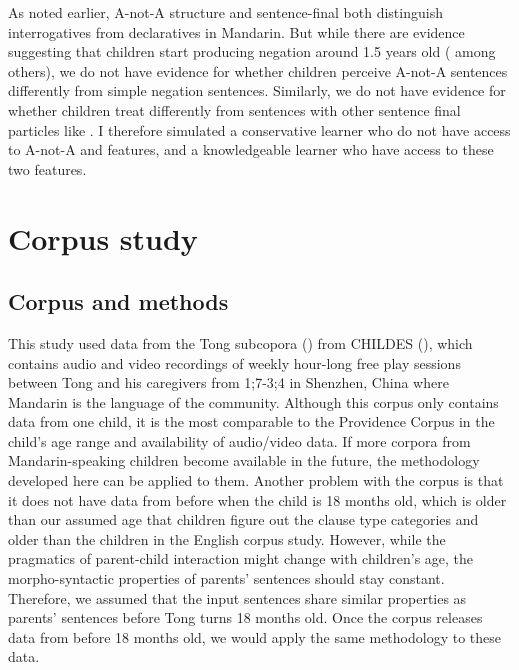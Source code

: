  As noted earlier, A-not-A structure and sentence-final  both distinguish interrogatives from declaratives in Mandarin. But while there are evidence suggesting that children start producing negation around 1.5 years old (\cite{lee1982,fan2007,li2019neg, huang2022manchild} among others), we do not have evidence for whether children perceive A-not-A sentences differently from simple negation sentences. Similarly, we do not have evidence for whether children treat  differently from sentences with other sentence final particles like . I therefore simulated a conservative learner who do not have access to A-not-A and  features, and a knowledgeable learner who have access to these two features. 





\section{Corpus study}
\label{sec:mancl:corpus}

\subsection{Corpus and methods}
\label{sec:mancl:corpus:method}
This study used data from the Tong subcopora (\cite{TongCorpus}) from CHILDES (\cite{CHILDES}), which contains audio and video recordings of weekly hour-long free play sessions between Tong and his caregivers from 1;7-3;4 in Shenzhen, China where Mandarin is the language of the community. Although this corpus only contains data from one child, it is the most comparable to the Providence Corpus in the child’s age range and availability of audio/video data. If more corpora from Mandarin-speaking children become available in the future, the methodology developed here can be applied to them. Another problem with the corpus is that it does not have data from before when the child is 18 months old, which is older than our assumed age that children figure out the clause type categories and older than the children in the English corpus study. However, while the pragmatics of parent-child interaction might change with children's age, the morpho-syntactic properties of parents' sentences should stay constant. Therefore, we assumed that the input sentences share similar properties as parents' sentences before Tong turns 18 months old. Once the corpus releases data from before 18 months old, we would apply the same methodology to these data. 

